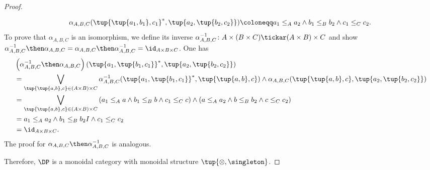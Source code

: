 \begin{proof}
\begin{itemize}
\begin{equation}
        \alpha_{A,B,C}(\tup{\tup{a_1,b_1},c_1}^*,\tup{a_2,\tup{b_2,c_2}})\coloneqq a_1\leq_Aa_2 \wedge b_1\leq_B b_2\wedge c_1\leq_C c_2.
    \end{equation}
    To prove that $\alpha_{A,B,C}$ is an isomorphism, we define its inverse $\alpha_{A,B,C}^{-1}\colon A\times (B\times C) \tickar (A\times B)\times C$ and show $\alpha_{A,B,C}^{-1}\then \alpha_{A,B,C}=\alpha_{A,B,C}\then \alpha_{A,B,C}^{-1}= \id_{A\times B\times C}$. One has
    \begin{equation}
        \begin{aligned}
           &\left( \alpha_{A,B,C}^{-1}\then \alpha_{A,B,C} \right)(\tup{a_1,\tup{b_1,c_1}}^*,\tup{a_2,\tup{b_2,c_2}})\\
           &=\bigvee_{\tup{\tup{a,b},c}\in (A\times B)\times C}
           \alpha_{A,B,C}^{-1}(\tup{a_1,\tup{b_1,c_1}}^*,\tup{\tup{a,b},c})\wedge \alpha_{A,B,C}(\tup{\tup{a,b},c},\tup{a_2,\tup{b_2,c_2}})\\
           &=\bigvee_{\tup{\tup{a,b},c}\in (A\times B)\times C}\left( a_1\leq_A a \wedge b_1\leq_B b \wedge c_1\leq_C c\right)\wedge \left(a\leq_A a_2\wedge b\leq_B b_2 \wedge c\leq_C c_2\right)\\
           &=a_1\leq_Aa_2\wedge b_1\leq_B b_2 I \wedge c_1\leq_C c_2\\
           &=\id_{A\times B\times C}.
        \end{aligned}
    \end{equation}
    The proof for $\alpha_{A,B,C}\then \alpha_{A,B,C}^{-1}$ is analogous.
\end{itemize}
Therefore, $\DP$ is a monoidal category with monoidal structure $\tup{\otimes, \singleton}$.
\end{proof}